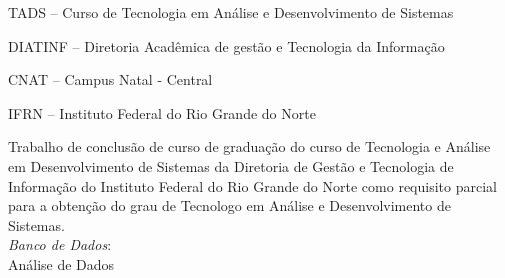 
\titulo{\Large{\thesistitle}}
\autor{\thesisauthor}
\orientador[Orientador]{\par \thesissupervisor}
\instituicao
{
	TADS -- Curso de Tecnologia em Análise e Desenvolvimento de
	Sistemas\par
	DIATINF -- Diretoria Acadêmica de gestão e Tecnologia da Informação\par
	CNAT -- Campus Natal - Central\par
	IFRN -- Instituto Federal do Rio Grande do Norte }

\comentario
{
	Trabalho de conclusão de curso de graduação do curso de Tecnologia e Análise em
	Desenvolvimento de Sistemas da Diretoria de Gestão e Tecnologia de Informação
	do Instituto Federal do Rio Grande do Norte como requisito parcial para a
	obtenção do grau de Tecnologo em Análise e Desenvolvimento de
	Sistemas.\bigskip\\
	\textit{Banco de Dados}:\\Análise de Dados
}


\folhaderosto